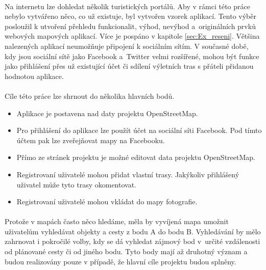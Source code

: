 \documentclass[11pt,a4paper,titlepage,oneside]{book}
\begin{document}


	\paragraph{} Na internetu lze dohledat několik turistických portálů. Aby v rámci této práce nebylo vytvářeno něco, co už existuje, byl vytvořen vzorek aplikací. Tento výběr posloužil k utvoření přehledu funkcionalit, výhod, nevýhod a~originálních prvků webových mapových aplikací. Více je pospáno v kapitole  \ref{sec:Ex_reseni}. Většina nalezených aplikací neumožňuje připojení k sociálním sítím. V současné době, kdy jsou sociální sítě jako Facebook a~Twitter velmi rozšířené, mohou být funkce jako přihlášení přes už existující účet či sdílení výletních tras s přáteli přidanou hodnotou aplikace. 


	\paragraph{} Cíle této práce lze shrnout do několika hlavních bodů.
		\begin{itemize}
			\item Aplikace je postavena nad daty projektu OpenStreetMap.
			\item Pro přihlášení do aplikace lze použít účet na sociální síti Facebook. Pod tímto účtem pak lze zveřejňovat mapy na Facebooku.
			\item Přímo ze stránek projektu je možné editovat data projektu OpenStreetMap.
			\item Registrovaní uživatelé mohou přidat vlastní trasy. Jakýkoliv přihlášený uživatel může tyto trasy okomentovat.
			\item Registrovaní uživatelé mohou vkládat do mapy fotografie.
		\end{itemize}
	\paragraph{} Protože v mapách často něco hledáme, měla by vyvíjená mapa umožnit uživatelům vyhledávat objekty a cesty z bodu A do bodu B. Vyhledávání by mělo zahrnovat i pokročilé volby, kdy se dá vyhledat zájmový bod v~určité vzdálenosti od plánované cesty či od jiného bodu. Tyto body mají až druhotný význam a budou realizovány pouze v případě, že hlavní cíle projektu budou splněny.
\end{document}
